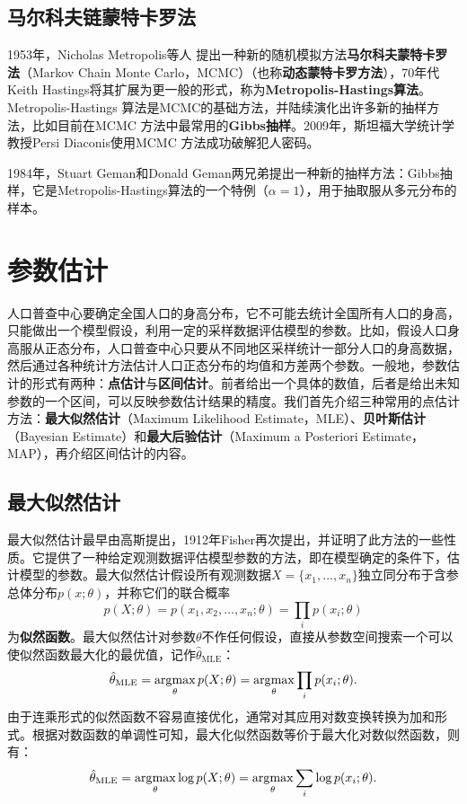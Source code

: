 \subsection{马尔科夫链蒙特卡罗法}
1953年，Nicholas Metropolis等人\cite{metropolis1953equation} 提出一种新的随机模拟方法\textbf{马尔科夫蒙特卡罗法}（Markov Chain Monte Carlo，MCMC）（也称\textbf{动态蒙特卡罗方法}），70年代Keith Hastings\cite{hastings1970monte}将其扩展为更一般的形式，称为\textbf{Metropolis-Hastings算法}。Metropolis-Hastings 算法是MCMC的基础方法，并陆续演化出许多新的抽样方法，比如目前在MCMC 方法中最常用的\textbf{Gibbs抽样}。2009年，斯坦福大学统计学教授Persi Diaconis\cite{diaconis2009markov}使用MCMC 方法成功破解犯人密码。

1984年，Stuart Geman和Donald Geman\cite{geman1984stochastic}两兄弟提出一种新的抽样方法：Gibbs抽样，它是Metropolis-Hastings算法的一个特例（$\alpha=1$），用于抽取服从多元分布的样本。

\section{参数估计}
人口普查中心要确定全国人口的身高分布，它不可能去统计全国所有人口的身高，只能做出一个模型假设，利用一定的采样数据评估模型的参数。比如，假设人口身高服从正态分布，人口普查中心只要从不同地区采样统计一部分人口的身高数据，然后通过各种统计方法估计人口正态分布的均值和方差两个参数。一般地，参数估计的形式有两种：\textbf{点估计}与\textbf{区间估计}。前者给出一个具体的数值，后者是给出未知参数的一个区间，可以反映参数估计结果的精度。我们首先介绍三种常用的点估计方法：\textbf{最大似然估计}（Maximum Likelihood Estimate，MLE）、\textbf{贝叶斯估计}（Bayesian Estimate）和\textbf{最大后验估计}（Maximum a Posteriori Estimate，MAP），再介绍区间估计的内容。

\subsection{最大似然估计}
最大似然估计最早由高斯提出，1912年Fisher再次提出，并证明了此方法的一些性质。它提供了一种给定观测数据评估模型参数的方法，即在模型确定的条件下，估计模型的参数。最大似然估计假设所有观测数据$X=\{x_1,\ldots,x_n\}$独立同分布于含参总体分布$p(x; \theta)$，并称它们的联合概率
\[
    p(X;\theta) = p(x_1,x_2,\ldots, x_n; \theta) = \prod\limits_i p(x_i; \theta)
\]
为\textbf{似然函数}。最大似然估计对参数$\theta$不作任何假设，直接从参数空间搜索一个可以使似然函数最大化的最优值，记作$\hat \theta_\mathrm{MLE}$：
\begin{equation}
   \hat \theta_\mathrm{MLE} = \operatorname*{\mathrm{\arg\!\max}}\limits_\theta p(X;\theta) = \operatorname*{\mathrm{\arg\!\max}}\limits_\theta \prod\limits_i p(x_i; \theta).
\end{equation}
由于连乘形式的似然函数不容易直接优化，通常对其应用对数变换转换为加和形式。根据对数函数的单调性可知，最大化似然函数等价于最大化对数似然函数，则有：
\begin{equation}
   \hat \theta_\mathrm{MLE} = \operatorname*{\mathrm{\arg\!\max}}\limits_\theta \log p(X;\theta) = \operatorname*{\mathrm{\arg\!\max}}\limits_\theta \sum\limits_i \log p(x_i; \theta).
\end{equation}

